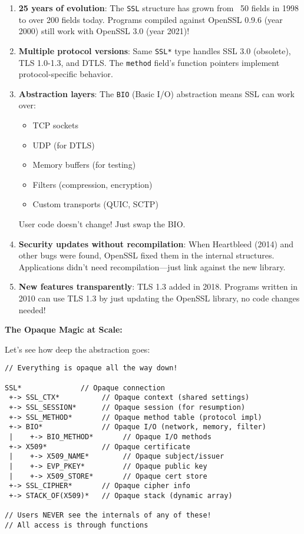 \begin{enumerate}
    \item \textbf{25 years of evolution}: The \texttt{SSL} structure has grown from ~50 fields in 1998 to over 200 fields today. Programs compiled against OpenSSL 0.9.6 (year 2000) still work with OpenSSL 3.0 (year 2021)!

    \item \textbf{Multiple protocol versions}: Same \texttt{SSL*} type handles SSL 3.0 (obsolete), TLS 1.0-1.3, and DTLS. The \texttt{method} field's function pointers implement protocol-specific behavior.

    \item \textbf{Abstraction layers}: The \texttt{BIO} (Basic I/O) abstraction means SSL can work over:
    \begin{itemize}
        \item TCP sockets
        \item UDP (for DTLS)
        \item Memory buffers (for testing)
        \item Filters (compression, encryption)
        \item Custom transports (QUIC, SCTP)
    \end{itemize}
    User code doesn't change! Just swap the BIO.

    \item \textbf{Security updates without recompilation}: When Heartbleed (2014) and other bugs were found, OpenSSL fixed them in the internal structures. Applications didn't need recompilation---just link against the new library.

    \item \textbf{New features transparently}: TLS 1.3 added in 2018. Programs written in 2010 can use TLS 1.3 by just updating the OpenSSL library, no code changes needed!
\end{enumerate}

\textbf{The Opaque Magic at Scale:}

Let's see how deep the abstraction goes:

\begin{lstlisting}
// Everything is opaque all the way down!

SSL*              // Opaque connection
 +-> SSL_CTX*          // Opaque context (shared settings)
 +-> SSL_SESSION*      // Opaque session (for resumption)
 +-> SSL_METHOD*       // Opaque method table (protocol impl)
 +-> BIO*              // Opaque I/O (network, memory, filter)
 |    +-> BIO_METHOD*       // Opaque I/O methods
 +-> X509*             // Opaque certificate
 |    +-> X509_NAME*        // Opaque subject/issuer
 |    +-> EVP_PKEY*         // Opaque public key
 |    +-> X509_STORE*       // Opaque cert store
 +-> SSL_CIPHER*       // Opaque cipher info
 +-> STACK_OF(X509)*   // Opaque stack (dynamic array)

// Users NEVER see the internals of any of these!
// All access is through functions
\end{lstlisting}

